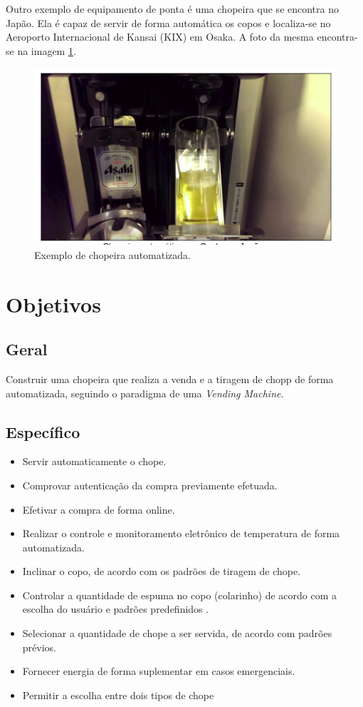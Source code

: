 	Outro exemplo de equipamento de ponta é uma chopeira  que se encontra no Japão. Ela é capaz de servir de forma 
	automática os copos e localiza-se no Aeroporto Internacional de Kansai (KIX) em Osaka. A foto da mesma encontra-se 
	na imagem \ref{exemplo-japao}.

	\begin{figure}[!htb]
		\centering
		\includegraphics[scale= 0.9]{figuras/exemplo-japao.png}
		\caption{Exemplo de chopeira automatizada.}
		\label{exemplo-japao}
	\end{figure}

	\section[Objetivos]{Objetivos}
		\subsection[Geral]{Geral}
			Construir uma chopeira que realiza a venda e a tiragem de chopp de forma automatizada, seguindo o 
			paradigma de uma \textit{Vending Machine}. 

		\subsection[Específico]{Específico}
			\begin{itemize}
				\item Servir automaticamente o chope.
				\item Comprovar autenticação da compra previamente efetuada.
				\item Efetivar a compra  de forma online. 
				\item Realizar o controle e monitoramento eletrônico de temperatura de forma automatizada.
				\item Inclinar o copo, de acordo com os padrões de tiragem de chope.
				\item Controlar a quantidade de espuma no copo (colarinho) de acordo com a escolha do usuário e padrões predefinidos .
				\item Selecionar a quantidade de chope a ser servida, de acordo com padrões prévios.
				\item Fornecer energia de forma suplementar em casos emergenciais.
				\item Permitir a escolha entre dois tipos de chope
			\end{itemize}
	
